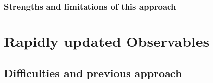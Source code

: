  
	
	
		\subsubsection{Strengths and limitations of this approach} 

\section{Rapidly updated Observables}
\label{sec:RapidlyUpdatedObservables}
	
	\subsection{Difficulties and previous approach}
	
